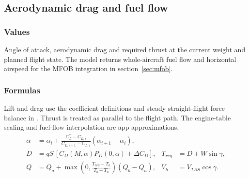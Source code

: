 \documentclass[10pt,a4paper]{amsart}
\begin{document}
\subsection{Aerodynamic drag and fuel flow}\label{subsec:route-flow}
\subsubsection*{Values}
Angle of attack, aerodynamic drag and required thrust at the current
weight and planned flight state. The model returns whole-aircraft fuel
flow and horizontal airspeed for the MFOB integration in
section~\ref{sec:mfob}.

\subsubsection*{Formulas}
Lift and drag use the coefficient definitions and steady straight-flight
force balance in \cite[pp.~1--1, 1--4 and 1--5]{how2004}.
Thrust is treated as parallel to the flight path. The engine-table
scaling and fuel-flow interpolation are app approximations.
\begin{align*}
 \alpha&=\alpha_i+
 \frac{C_L^*-C_{L,i}}{C_{L,i+1}-C_{L,i}}(\alpha_{i+1}-\alpha_i),\\
 D&=qS\,[C_D(M,\alpha)P_D(0,\alpha)+\Delta C_D],&
 T_{req}&=D+W\sin\gamma,\\
 Q&=Q_a+\max\!\left(0,\frac{T_{req}-T_a}{T_b-T_a}\right)(Q_b-Q_a),&
 V_h&=V_{TAS}\cos\gamma.
\end{align*}
\end{document}
